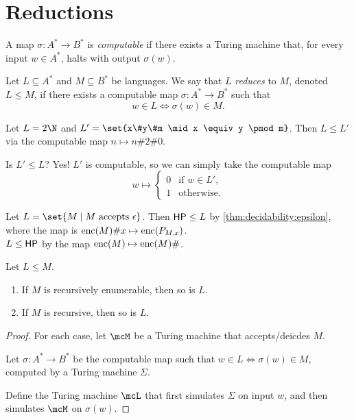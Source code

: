 \section{Reductions} \label{sec:reductions}
\begin{definition} \label{def:reductions:computable_map}
    A map $\sigma\colon A^* \to B^*$ is \emph{computable} if there exists a
    Turing machine \mcM{} that, for every input $w \in A^*$,
    halts with output $\sigma(w)$.
\end{definition}
\begin{definition*}[Reduction] \label{def:reduction}
    Let $L \subseteq A^*$ and $M \subseteq B^*$ be languages.
    We say that $L$ \emph{reduces} to $M$, denoted $L \le M$, if there
    exists a computable map $\sigma\colon A^* \to B^*$ such that \[
        w \in L \iff \sigma(w) \in M.
    \]
\end{definition*}
\begin{examples}
    \item Let $L = 2\N$ and $L' = \set{x\#y\#m \mid x \equiv y \pmod m}$.
    Then $L \le L'$ via the computable map $n \mapsto n\#2\#0$.

    Is $L' \le L$? Yes!
    $L'$ is computable, so we can simply take the computable map \[
        w \mapsto \begin{cases}
            0 & \text{if } w \in L', \\
            1 & \text{otherwise}.
        \end{cases}
    \]
    \item Let $L = \set{M \mid M \text{ accepts } \epsilon}$.
    Then $\mathsf{HP} \le L$ by \cref{thm:decidability:epsilon}, where the map is
    $\operatorname{enc}(M)\#x \mapsto \operatorname{enc}(P_{M,x})$. \\
    $L \le \mathsf{HP}$ by the map $\operatorname{enc}(M) \mapsto \operatorname{enc}(M)\#$.
\end{examples}

\begin{theorem*} \label{thm:reductions:recursion}
    Let $L \le M$.
    \begin{enumerate}
        \item If $M$ is recursively enumerable, then so is $L$.
        \item If $M$ is recursive, then so is $L$.
    \end{enumerate}
\end{theorem*}
\begin{proof}
    For each case, let $\mcM$ be a Turing machine that accepts/deicdes $M$.

    Let $\sigma\colon A^* \to B^*$ be the computable map such that $w \in L
    \iff \sigma(w) \in M$, computed by a Turing machine $\Sigma$.

    Define the Turing machine $\mcL$ that first simulates $\Sigma$
    on input $w$, and then simulates $\mcM$ on $\sigma(w)$.
\end{proof}

